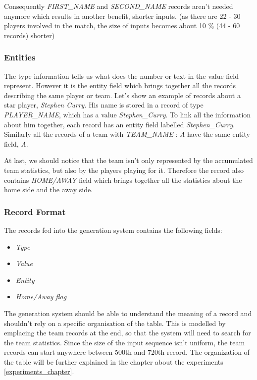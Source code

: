Consequently \emph{FIRST\_NAME} and \emph{SECOND\_NAME} records aren't needed anymore which results in another benefit, shorter inputs. (as there are 22 - 30 players involved in the match, the size of inputs becomes about 10 \% (44 - 60 records) shorter)

\subsubsection{Entities}

The type information tells us what does the number or text in the value field represent. However it is the entity field which brings together all the records describing the same player or team. Let's show an example of records about a star player, \emph{Stephen Curry}. His name is stored in a record of type \emph{PLAYER\_NAME}, which has a value \emph{Stephen\_Curry}. To link all the information about him together, each record has an entity field labelled \emph{Stephen\_Curry}. Similarly all the records of a team with \emph{TEAM\_NAME} : \emph{A} have the same entity field, \emph{A}.

At last, we should notice that the team isn't only represented by the accumulated team statistics, but also by the players playing for it. Therefore the record also contains \emph{HOME/AWAY} field which brings together all the statistics about the home side and the away side.

\subsubsection{Record Format}

The records fed into the generation system contains the following fields:

\begin{itemize}
    \item \emph{Type}
    \item \emph{Value}
    \item \emph{Entity}
    \item \emph{Home/Away flag}
\end{itemize}

The generation system should be able to understand the meaning of a record and shouldn't rely on a specific organisation of the table. This is modelled by emplacing the team records at the end, so that the system will need to search for the team statistics. Since the size of the input sequence isn't uniform, the team records can start anywhere between 500th and 720th record. The organization of the table will be further explained in the chapter about the experiments \ref{experiments_chapter}.


